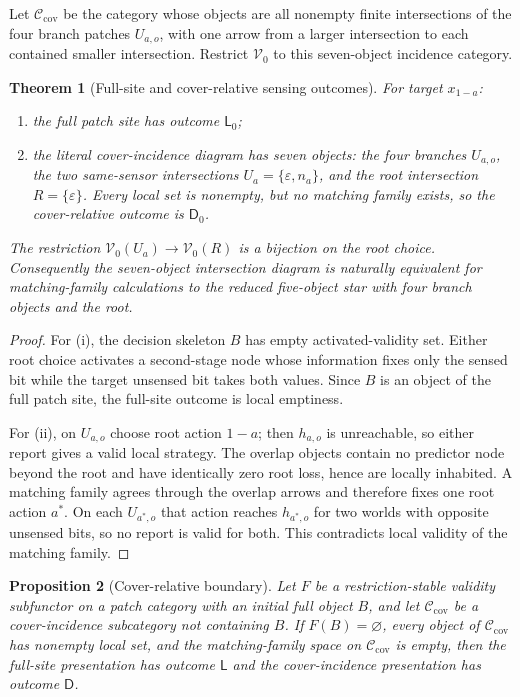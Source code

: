 \documentclass[11pt]{article}
\theoremstyle{plain}
\newtheorem{theorem}{Theorem}[section]
\newtheorem{proposition}[theorem]{Proposition}
\theoremstyle{definition}
\theoremstyle{remark}
\begin{document}
Let $\mathcal C_{\mathrm{cov}}$ be the category whose objects are all nonempty
finite intersections of the four branch patches $U_{a,o}$, with one arrow from a
larger intersection to each contained smaller intersection. Restrict
$\mathscr V_0$ to this seven-object incidence category.

\begin{theorem}[Full-site and cover-relative sensing outcomes]
\label{thm:sensing-negative}
For target $x_{1-a}$:
\begin{enumerate}[label=(\roman*)]
\item the full patch site has outcome $\mathsf L_0$;
\item the literal cover-incidence diagram has seven objects: the four branches
$U_{a,o}$, the two same-sensor intersections
$U_a=\{\varepsilon,n_a\}$, and the root intersection
$R=\{\varepsilon\}$. Every local set is nonempty, but no matching family exists,
so the cover-relative outcome is $\mathsf D_0$.
\end{enumerate}
The restriction $\mathscr V_0(U_a)\to\mathscr V_0(R)$ is a bijection on the
root choice. Consequently the seven-object intersection diagram is naturally
equivalent for matching-family calculations to the reduced five-object star
with four branch objects and the root.
\end{theorem}

\begin{proof}
For (i), the decision skeleton $B$ has empty activated-validity set. Either root
choice activates a second-stage node whose information fixes only the sensed bit
while the target unsensed bit takes both values. Since $B$ is an object of the
full patch site, the full-site outcome is local emptiness.

For (ii), on $U_{a,o}$ choose root action $1-a$; then $h_{a,o}$ is unreachable,
so either report gives a valid local strategy. The overlap objects contain no
predictor node beyond the root and have identically zero root loss, hence are
locally inhabited. A matching family agrees through the overlap arrows and
therefore fixes one root action $a^*$. On each $U_{a^*,o}$ that action reaches
$h_{a^*,o}$ for two worlds with opposite unsensed bits, so no report is valid for
both. This contradicts local validity of the matching family.
\end{proof}

\begin{proposition}[Cover-relative boundary]
\label{prop:cover-boundary}
Let $F$ be a restriction-stable validity subfunctor on a patch category with an
initial full object $B$, and let $\mathcal C_{\mathrm{cov}}$ be a cover-incidence
subcategory not containing $B$. If $F(B)=\varnothing$, every object of
$\mathcal C_{\mathrm{cov}}$ has nonempty local set, and the matching-family space
on $\mathcal C_{\mathrm{cov}}$ is empty, then the full-site presentation has
outcome $\mathsf L$ and the cover-incidence presentation has outcome
$\mathsf D$.
\end{proposition}
\end{document}
